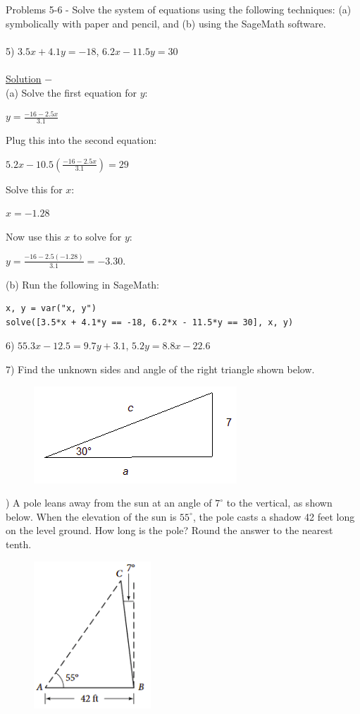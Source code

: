 \documentclass[12pt]{article}
\begin{document}
Problems 5-6 - Solve the system of equations using the following techniques:
(a) symbolically with paper and pencil, and
(b) using the SageMath software. \\ \\
5) $3.5x + 4.1y = -18$, $6.2x - 11.5y = 30$ \\ \\
\underline{Solution} $-$ \\
(a) Solve the first equation for $y$:
\begin{center}
$y = \frac{-16 - 2.5x}{3.1}$
\end{center}
Plug this into the second equation:
\begin{center}
$5.2x - 10.5 \left( \frac{-16 - 2.5x}{3.1} \right) = 29$
\end{center}
Solve this for $x$:
\begin{center}
$x = -1.28$
\end{center}
Now use this $x$ to solve for $y$:
\begin{center}
$y = \frac{-16 - 2.5(-1.28)}{3.1} = -3.30.$
\end{center}
(b) Run the following in SageMath:
\begin{verbatim}
x, y = var("x, y")
solve([3.5*x + 4.1*y == -18, 6.2*x - 11.5*y == 30], x, y)
\end{verbatim}

\pagebreak

6) $55.3x - 12.5 = 9.7y + 3.1$, $5.2y = 8.8x - 22.6$

\pagebreak

7) Find the unknown sides and angle of the right triangle shown below.
\begin{figure}[!h]
\includegraphics[scale=0.8]{figures/rightTriangle.png}
\end{figure}

) A pole leans away from the sun at an angle of $7^\circ$ to the vertical, as shown below.
When the elevation of the sun is $55^\circ$, the pole casts a shadow 42 feet long on the level ground.
How long is the pole?
Round the answer to the nearest tenth.
\begin{figure}[!h]
\includegraphics[scale=0.8]{figures/problem08.png}
\end{figure}
\end{document}
